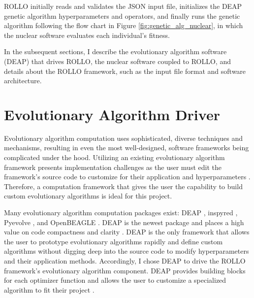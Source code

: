 \gls{ROLLO} initially reads and validates the JSON input 
file, initializes the \gls{DEAP} \cite{fortin_deap_2012} genetic algorithm 
hyperparameters and operators, and finally runs the genetic algorithm following 
the flow chart in Figure \ref{fig:genetic_alg_nuclear}, in which the nuclear 
software evaluates each individual's fitness. 

In the subsequent sections, I describe the evolutionary algorithm software (DEAP)
that drives \gls{ROLLO}, the nuclear software coupled to \gls{ROLLO}, and details about 
the \gls{ROLLO} framework, such as the input file format and software architecture. 

\section{Evolutionary Algorithm Driver}
Evolutionary algorithm computation uses sophisticated, diverse techniques 
and mechanisms, resulting in even the most well-designed, software frameworks 
being complicated under the hood. 
Utilizing an existing evolutionary algorithm framework presents implementation 
challenges as the user must edit the framework's source code to customize for their 
application and hyperparameters \cite{fortin_deap_2012}. 
Therefore, a computation framework that gives the user the capability to build 
custom evolutionary algorithms is ideal for this project.

Many evolutionary algorithm computation packages exist: 
\gls{DEAP} \cite{fortin_deap_2012}, inspyred \cite{garrett_inspyred_2014}, 
Pyevolve \cite{perone_pyevolve_2009}, and OpenBEAGLE \cite{gagne_open_2002}.
\gls{DEAP} is the newest package and places a high value on code 
compactness and clarity \cite{fortin_deap_2012}. 
\gls{DEAP} is the only framework that allows the user to prototype evolutionary 
algorithms rapidly and define custom algorithms without digging deep into 
the source code to modify hyperparameters and their application methods.
Accordingly, I chose \gls{DEAP} to drive the \gls{ROLLO} framework's 
evolutionary algorithm component. 
\gls{DEAP} provides building blocks for each optimizer function and allows the 
user to customize a specialized algorithm to fit their project \cite{fortin_deap_2012}.

